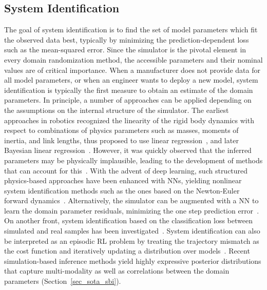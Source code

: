 \documentclass[utf8]{frontiersSCNS} %
\begin{document}
\subsection{System Identification}
\label{sec_sota_system_identification}
The goal of system identification is to find the set of model parameters which fit the observed data best, typically by minimizing the prediction-dependent loss such as the mean-squared error.
Since the simulator is the pivotal element in every domain randomization method, the accessible parameters and their nominal values are of critical importance.
When a manufacturer does not provide data for all model parameters, or when an engineer wants to deploy a new model, system identification is typically the first measure to obtain an estimate of the domain parameters.
%
In principle, a number of approaches can be applied depending on the assumptions on the internal structure of the simulator.
The earliest approaches in robotics recognized the linearity of the rigid body dynamics with respect to combinations of physics parameters such as masses, moments of inertia, and link lengths, thus proposed to use linear regression~\citep{Atkeson_Hollerbach_86}, and later Bayesian linear regression~\citep{Ting_Nakanishi_06}.
%
However, it was quickly observed that the inferred parameters may be physically implausible, leading to the development of methods that can account for this~\citep{Ting_Schaal_11}.
%
With the advent of deep learning, such structured physics-based approaches have been enhanced with \acp{NN}, yielding nonlinear system identification methods such as the ones based on the Newton-Euler forward dynamics~\citep{Sutanto_Meier_20,Lutter_Silberbauer_Peters_21}.
%
Alternatively, the simulator can be augmented with a \ac{NN} to learn the domain parameter residuals, minimizing the one step prediction error~\citep{Allevato_Thomaz_19}.
%
On another front, system identification based on the classification loss between simulated and real samples has been investigated~\citep{Jiang_Tan_21,Du_Watkins_Pathak_21}.
%
System identification can also be interpreted as an episodic \ac{RL} problem by treating the trajectory mismatch as the cost function and iteratively updating a distribution over models~\citep{Chebotar_Fox_19}.
Recent simulation-based inference methods yield highly expressive posterior distributions that capture multi-modality as well as correlations between the domain parameters (Section~\ref{sec_sota_sbi}).
\end{document}

